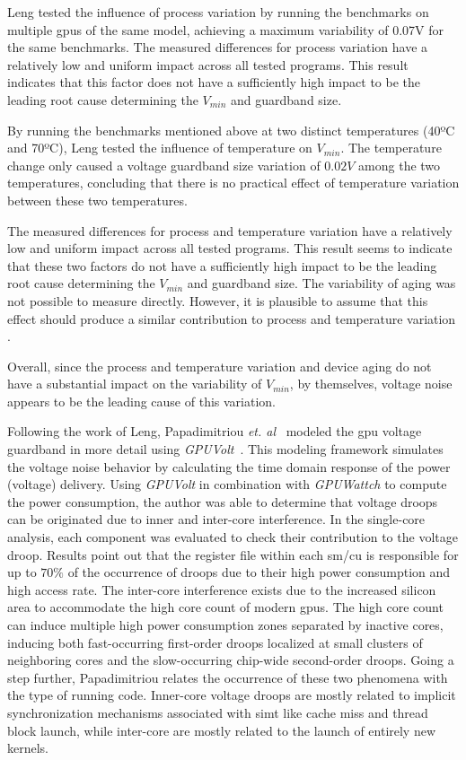 Leng tested the influence of process variation by running the benchmarks on multiple \acrshort{gpu}s of the same model, achieving a maximum variability of 0.07V for the same benchmarks. The measured differences for process variation have a relatively low and uniform impact across all tested programs. This result indicates that this factor does not have a sufficiently high impact to be the leading root cause determining the $V_{min}$ and guardband size.

By running the benchmarks mentioned above at two distinct temperatures (40ºC and 70ºC), Leng tested the influence of temperature on $V_{min}$. The temperature change only caused a voltage guardband size variation of $0.02V$ among the two temperatures, concluding that there is no practical effect of temperature variation between these two temperatures.

The measured differences for process and temperature variation have a relatively low and uniform impact across all tested programs. This result seems to indicate that these two factors do not have a sufficiently high impact to be the leading root cause determining the $V_{min}$ and guardband size.
The variability of aging was not possible to measure directly. However, it is plausible to assume that this effect should produce a similar contribution to process and temperature variation \cite{leng_safe_2015}.

Overall, since the process and temperature variation and device aging do not have a substantial impact on the variability of $V_{min}$, by themselves, voltage noise appears to be the leading cause of this variation.

Following the work of Leng, Papadimitriou \textit{et. al}~\cite{papadimitriou_exceeding_2020} modeled the \acrshort{gpu} voltage guardband in more detail using \textit{GPUVolt}~\cite{leng_gpuvolt_2014}. This modeling framework simulates the voltage noise behavior by calculating the time domain response of the power (voltage) delivery. Using \textit{GPUVolt} in combination with \textit{GPUWattch} to compute the power consumption, the author was able to determine that voltage droops can be originated due to inner and inter-core interference. In the single-core analysis, each component was evaluated to check their contribution to the voltage droop. Results point out that the register file within each \acrshort{sm}/\acrshort{cu} is responsible for up to $70\%$ of the occurrence of droops due to their high power consumption and high access rate. The inter-core interference exists due to the increased silicon area to accommodate the high core count of modern \acrshort{gpu}s. The high core count can induce multiple high power consumption zones separated by inactive cores, inducing both fast-occurring first-order droops localized at small clusters of neighboring cores and the slow-occurring chip-wide second-order droops. Going a step further, Papadimitriou relates the occurrence of these two phenomena with the type of running code. Inner-core voltage droops are mostly related to implicit synchronization mechanisms associated with \acrshort{simt} like cache miss and thread block launch, while inter-core are mostly related to the launch of entirely new kernels.

